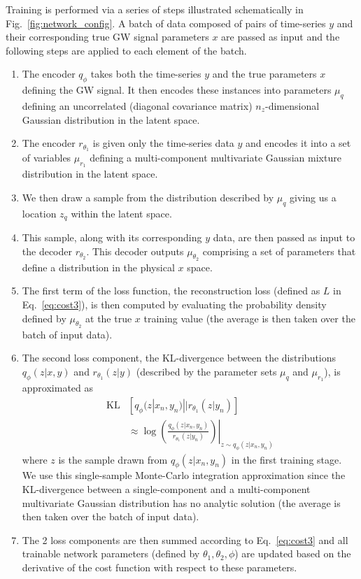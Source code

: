 \documentclass[%
showpacs,
nofootinbib,
 amsmath,amssymb,
 aps,
 twocolumn,
 prl,
 reprint,
floatfix,
]{revtex4-1}
\begin{document}
%
%
Training is performed via a series of steps illustrated schematically in
Fig.~\ref{fig:network_config}. A batch of data composed of pairs of
time-series $y$ and their corresponding true \ac{GW} signal parameters $x$ are
passed as input and the following steps are applied to each element of the
batch.
%
\begin{enumerate}
%
\item The encoder $q_{\phi}$ takes both the time-series
$y$ and the true parameters $x$ defining the \ac{GW} signal. It then encodes
these instances into parameters $\mu_{q}$ defining an uncorrelated (diagonal covariance matrix)
$n_z$-dimensional Gaussian distribution in the latent space. 
%
\item The encoder $r_{\theta_1}$ is given only the time-series data
$y$ and encodes it into a set of variables $\mu_{r_1}$ defining a
multi-component multivariate Gaussian mixture distribution
in the latent space.
%
\item We then draw a sample from the distribution described by $\mu_{q}$ giving us
a location $z_{q}$ within the latent space.
%
\item This sample, along with its corresponding $y$ data, are then passed
as input to the decoder $r_{\theta_2}$. This decoder outputs $\mu_{\theta_2}$
comprising a set of parameters that define a distribution in the physical $x$
space. 
\item The first term of the loss function, the reconstruction loss (defined as $L$ in
Eq.~\ref{eq:cost3}), is then computed by evaluating the probability density
defined by $\mu_{\theta_2}$ at the true $x$ training value (the average
is then taken over the batch of input data). 
%
\item The second loss component, the \ac{KL}-divergence between
the distributions $q_{\phi}(z|x,y)$ and $r_{\theta_1}(z|y)$ (described by
the parameter sets $\mu_{q}$ and $\mu_{r_1}$), is approximated as 
%
\begin{align}\label{eq:klgauss}
\text{KL}&\left[ q_{\phi}(z|x_{n},y_{n})||r_{\theta_{1}}(z|y_{n})\right] \\
&\approx \left.\log\left(\frac{q_{\phi}(z|x_n,y_n)}{r_{\theta_1}(z|y_n)}\right)\right|_{z\sim
q_{\phi}(z|x_n,y_n)}\nonumber
\end{align}
%
where $z$ is the sample drawn from $q_{\phi}(z|x_n,y_n)$ in the first
training stage. We use this single-sample Monte-Carlo integration approximation
since the \ac{KL}-divergence between a single-component and a multi-component
multivariate Gaussian distribution has no analytic solution (the average
is then taken over the batch of input data). 
%
\item The 2 loss components are then summed according to Eq.~\ref{eq:cost3} and
all trainable network parameters (defined by $\theta_1,\theta_2,\phi$) are
updated based on the derivative of the cost function with respect to these
parameters.
%
\end{enumerate}
\end{document}
